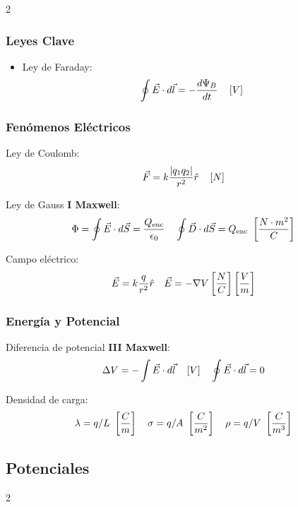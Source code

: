 \documentclass{article}
\begin{document}
    
\begin{multicols}{2}
\vspace{-0.5pt}

  \subsubsection*{Leyes Clave}
  \begin{itemize}[leftmargin=*]
      \item Ley de Faraday:
    $$\oint \vec{E}\cdot d\vec{l} = -\frac{d\Psi_B}{dt} \quad \left[V \right]$$

  \end{itemize}

  \subsubsection*{Fenómenos Eléctricos}
  \begin{itemform}
    \item Ley de Coulomb:
    $$\vec{F} = k\frac{|q_1q_2|}{r^2}\hat{r} \quad \left[N \right]$$
    \item Ley de Gauss \textbf{I Maxwell}: 
    $$\Phi=\oint \vec{E}\cdot d\vec{S} = \frac{Q_{\text{enc}}}{\epsilon_0} \quad \oint \vec{D}\cdot d\vec{S} = Q_{\text{enc}} \  \left[\dfrac{N\cdot m^2}{C} \right]$$
    \item Campo eléctrico:
    $$\vec{E} = k\frac{q}{r^2}\hat{r} \quad \vec{E}=-\nabla V  \left[\dfrac{N}{C} \right]  \left[\dfrac{V}{m} \right]$$
  \end{itemform}

  \subsubsection*{Energía y Potencial}
  \begin{itemform}
    \item Diferencia de potencial \textbf{III Maxwell}:
    $$\Delta V = -\int \vec{E}\cdot d\vec{l}  \quad \left[V \right] \quad \oint \vec{E}\cdot d\vec{l}=0$$
    \item Densidad de carga:
    $$\lambda = q/L \text{  } \left[\dfrac{C}{m} \right] \quad
    \sigma = q/A \text{  }\left[\dfrac{C}{m^2} \right] \quad
    \rho = q/V \text{  }\left[\dfrac{C}{m^3} \right]$$
  \end{itemform}

  \subsection*{Potenciales}
  \begin{multicols}{2}
      

\end{multicols}
\end{multicols}
\end{document}
